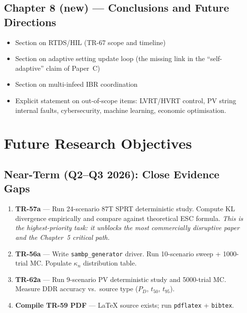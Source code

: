 \documentclass[12pt,a4paper]{article}
\newcommand{\kn}{\kappa_n}
\begin{document}
\subsection{Chapter 8 (new) — Conclusions and Future Directions}

\begin{itemize}
  \item Section on RTDS/HIL (TR-67 scope and timeline)
  \item Section on adaptive setting update loop (the missing link in the
    ``self-adaptive'' claim of Paper~C)
  \item Section on multi-infeed IBR coordination
  \item Explicit statement on out-of-scope items: LVRT/HVRT control,
    PV string internal faults, cybersecurity, machine learning,
    economic optimisation.
\end{itemize}

\section{Future Research Objectives}
\label{sec:future}

\subsection{Near-Term (Q2--Q3 2026): Close Evidence Gaps}

\begin{enumerate}
  \item \textbf{TR-57a} — Run 24-scenario 87T SPRT deterministic study.
    Compute KL divergence empirically and compare against theoretical ESC formula.
    \textit{This is the highest-priority task: it unblocks the most commercially
    disruptive paper and the Chapter~5 critical path.}
  \item \textbf{TR-56a} — Write \texttt{sambp\_generator} driver.
    Run 10-scenario sweep + 1000-trial MC.  Populate $\kn$ distribution table.
  \item \textbf{TR-62a} — Run 9-scenario PV deterministic study and 5000-trial MC.
    Measure DDR accuracy vs.\ source type ($P_D$, $t_{50}$, $t_{95}$).
  \item \textbf{Compile TR-59 PDF} — LaTeX source exists; run \texttt{pdflatex} + \texttt{bibtex}.
\end{enumerate}
\end{document}
